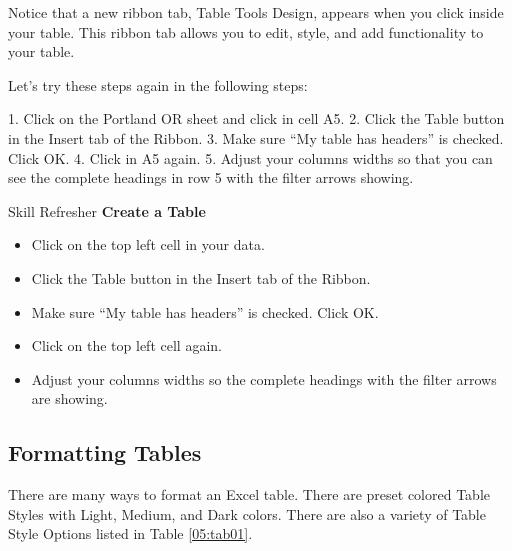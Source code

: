 Notice that a new ribbon tab, Table Tools Design, appears when you click inside your table. This
ribbon tab allows you to edit, style, and add functionality to your table.

Let’s try these steps again in the following steps:

1.    Click on the Portland OR sheet and click in cell A5.
2.    Click the Table button in the Insert tab of the Ribbon.
3.    Make sure “My table has headers” is checked. Click OK.
4.    Click in A5 again.
5.    Adjust your columns widths so that you can see the complete headings in row 5 with the filter
arrows showing.

\begin{center}
	\begin{sklbox}{Skill Refresher}
		\textbf{Create a Table}
		\\
		\begin{itemize}
			\setlength{\itemsep}{0pt}
			\setlength{\parskip}{0pt}
			\setlength{\parsep}{0pt}

			\item Click on the top left cell in your data.
			\item Click the Table button in the Insert tab of the Ribbon.
			\item Make sure ``My table has headers'' is checked. Click OK.
			\item Click on the top left cell again.
			\item Adjust your columns widths so the complete headings with the filter arrows are showing.
						
		\end{itemize}
	\end{sklbox}
\end{center}







\subsection{Formatting Tables}

There are many ways to format an Excel table. There are preset colored Table Styles with Light,
Medium, and Dark colors. There are also a variety of Table Style Options listed in Table \ref{05:tab01}.


